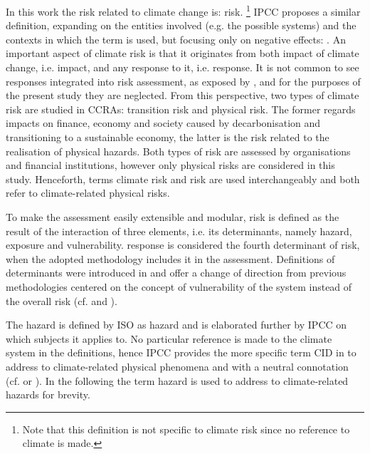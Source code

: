 In this work the \gls{risk} related to climate change is: \glsdesc{risk}.%
\footnote{Note that this definition is not specific to climate \gls{risk} since no reference to climate is made.}
\Gls{IPCC} proposes a similar definition, expanding on the entities involved (e.g. the possible systems) and the contexts in which the term is used, but focusing only on negative effects: .
An important aspect of climate \gls{risk} is that it originates from both \gls{impact} of climate change, i.e. \glsdesc{impact}, and any response to it, i.e. \glsdesc{response}. It is not common to see \glspl{response} integrated into risk assessment, as exposed by \cite[492]{2021SimpsonAFramework}, and for the purposes of the present study they are neglected.
From this perspective, two types of climate \gls{risk} are studied in \glspl{CCRA}: transition risk and physical risk. The former regards \glspl{impact} on finance, economy and society caused by decarbonisation and transitioning to a sustainable economy, the latter is the risk related to the realisation of physical hazards. Both types of risk are assessed by organisations and financial institutions,\cite{2023CarlinThe2023,2023CarlinTechnicalSupplement} however only physical risks are considered in this study.
Henceforth, terms climate \gls{risk} and risk are used interchangeably and both refer to climate-related physical risks.

To make the assessment easily extensible and modular, \gls{risk} is defined as the result of the interaction of three elements, i.e. its \glspl{determinant}, namely \gls{hazard}, \gls{exposure} and \gls{vulnerability}. \Gls{response} is considered the fourth \gls{determinant} of \gls{risk}, when the adopted methodology includes it in the assessment.
Definitions of \glspl{determinant} were introduced in \cite[69-70]{2012FieldManagingThe} and offer a change of direction from previous methodologies centered on the concept of \gls{vulnerability} of the system instead of the overall \gls{risk} (cf. \cite{2017GIZTheVulnerability} and \cite{2017GIZRiskSupplement}).

The \gls{hazard} is defined by \gls{ISO} as \glsdesc{hazard} and is elaborated further by \gls{IPCC} on which subjects it applies to. No particular reference is made to the climate system in the definitions, hence \gls{IPCC} provides the more specific term \gls{CID} in \cite[2224]{2021MatthewsAnnexVII} to address to climate-related physical phenomena and with a neutral connotation (cf. \cite[10]{2020ReisingerTheConcept} or \cite[1871-1872]{2021RanasingheClimateChange}). In the following the term \gls{hazard} is used to address to climate-related \glspl{hazard} for brevity.


